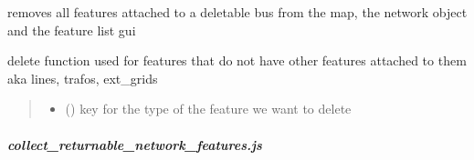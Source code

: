 \documentclass[letterpaper,10pt,english]{sphinxmanual}
\begin{document}

\begin{fulllineitems}
\label{\detokenize{docs_gui/js_api/network_editor/add_delete_new_network_features:deleteConnectedFeatures}}
\pysigstartsignatures
{}
\pysigstopsignatures
\sphinxAtStartPar
removes all features attached to a deletable bus from the map, the network object and the feature list gui

\end{fulllineitems}


\begin{fulllineitems}
\label{\detokenize{docs_gui/js_api/network_editor/add_delete_new_network_features:deleteFeature}}
\pysigstartsignatures
{}
\pysigstopsignatures
\sphinxAtStartPar
delete function used for features that do not have other features attached to them aka lines, trafos, ext\_grids
\begin{quote}\begin{description}
\begin{itemize}
\item {} 
\sphinxAtStartPar
{} () \textendash{} key for the type of the feature we want to delete

\end{itemize}

\end{description}\end{quote}

\end{fulllineitems}


\sphinxstepscope


\subparagraph{collect\_returnable\_network\_features.js}
\label{\detokenize{docs_gui/js_api/network_editor/collect_returnable_network_features:collect-returnable-network-features-js}}\label{\detokenize{docs_gui/js_api/network_editor/collect_returnable_network_features::doc}}
\end{document}
